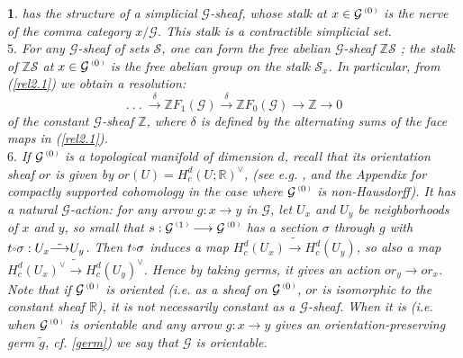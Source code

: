 \documentclass[a4paper]{article}
\newtheorem{num}[st]{}
\newcommand{\rmap}{\longrightarrow}
\newcommand{\G}{\ensuremath{\mathcal{G}}}
\newcommand{\es}{\ensuremath{\mathcal{S}}}
\newcommand{\ps}{{\raise 1pt\hbox{\tiny (}}}
\newcommand{\pd}{{\raise 1pt\hbox{\tiny )}}}
\newcommand{\nG}[1]{\ensuremath{\G^{\,\ps #1\,\pd}}}
\def\compose{{\raise 1pt\hbox{$\scriptscriptstyle\circ$}}}
\begin{document}
\begin{num}
{has the structure of a simplicial $\G$-sheaf, whose stalk at $x \in \nG{0}$ is the nerve of the comma category $x/\G$. This stalk is a contractible simplicial set.\\
\hspace*{.3in} $5.$ For any $\G$-sheaf of sets $\es$, one can form the free abelian $\G$-sheaf $\mathbb{Z}\es$ ; the stalk of $\mathbb{Z}\es$ at $x \in \nG{0}$ is the free abelian group on the stalk $\es_{x}$. In particular, from (\ref{rel2.1}) we obtain a resolution: 
\begin{equation}
\label{rel2.free}
 .\ .\ .\ \stackrel{\delta}{\rmap} \mathbb{Z}F_{1}(\G) \stackrel{\delta}{\rmap} \mathbb{Z}F_{0}(\G) \rmap \mathbb{Z} \rmap 0 
\end{equation}
of the constant $\G$-sheaf $\mathbb{Z}$, where $\delta$ is defined by the alternating sums of the face maps in (\ref{rel2.1}).\\
\hspace*{.3in} $6.$ If $\nG{0}$ is a topological manifold of dimension $d$, recall that its orientation sheaf $or$ is given by $or(U)=H_{c}^{d}(U;\mathbb{R})^{\vee}$, (see e.g. \cite{BoTu, Iv}, and the Appendix for compactly supported cohomology in the case where $\nG{0}$ is non-Hausdorff). It has a natural $\G$-action: for any arrow $g: x\rmap y$ in $\G$, let $U_{x}$ and $U_{y}$ be neighborhoods of $x$ and $y$, so small that $s:\nG{1}\rmap\nG{0}$ has a section $\sigma$ through $g$ with $t\compose\sigma: U_{x}\tilde{\rmap} U_{y}$. Then $t\compose\sigma$ induces a map $H_{c}^{d}(U_{x})\tilde{\rmap} H_{c}^{d}(U_{y})$, so also a map $H_{c}^{d}(U_{x})^{\vee}\tilde{\rmap} H_{c}^{d}(U_{y})^{\vee}$. Hence by taking germs, it gives an action $or_{y}\rmap or_{x}$.\\
\hspace*{.3in} Note that if $\nG{0}$ is oriented (i.e. as a sheaf on $\nG{0}$, $or$ is isomorphic to the constant sheaf $\mathbb{R}$), it is not necessarily constant as a $\G$-sheaf. When it is (i.e. when $\nG{0}$ is orientable and any arrow $g: x\rmap y$ gives an orientation-preserving germ $\tilde{g}$, cf. \ref{germ}) we say that $\G$ is {\it orientable}.
}
\end{num}
\end{document}

